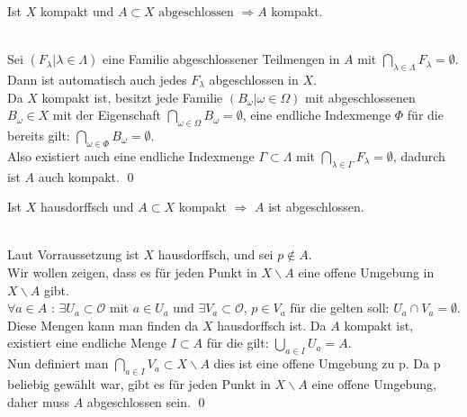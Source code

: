 \begin{Satz}
		Ist \(X\) kompakt und \(A \subset X \mbox{ abgeschlossen } \Rightarrow A\) kompakt.
\end{Satz}
%
	\\
 	Sei \((F_{\lambda} | \lambda \in \Lambda) \) eine Familie abgeschlossener Teilmengen in \(A\) mit \( \bigcap_{\lambda \in \Lambda } F_{\lambda} = \emptyset \).\\
	Dann ist automatisch auch jedes \(F_{\lambda} \) abgeschlossen in \(X\).\\
	Da \(X\) kompakt ist, besitzt jede Familie \((B_{\omega} | \omega \in \Omega) \) mit abgeschlossenen 
	\(B_{\omega} \in X \) mit der Eigenschaft \( \bigcap_{\omega \in \Omega} B_{\omega} = \emptyset\), eine 
	endliche Indexmenge \(\Phi\) für die bereits gilt: \( \bigcap_{\omega \in \Phi} B_{\omega} = \emptyset\).\\
	Also existiert auch eine endliche Indexmenge \( \Gamma \subset \Lambda \) mit \( \bigcap_{\lambda \in \Gamma } F_{\lambda} = \emptyset \), dadurch ist 
	\(A\) auch kompakt.
\qed
		
		
\begin{Satz}
	Ist \(X\) hausdorffsch und \(A \subset X \) kompakt \( \Rightarrow \) \(A\) ist abgeschlossen.
\end{Satz}
%
	\\
	Laut Vorraussetzung ist \(X\) hausdorffsch, und sei \(p \notin A \). \\
	Wir wollen zeigen, dass es für jeden Punkt in \(X \backslash A \) eine offene Umgebung in \(X \backslash A \) gibt.\\
	\( \forall a \in A\) : \(\exists U_{a}\subset \mathcal{O} \) mit \(  a \in U_{a}\) und \(\exists V_{a}\subset \mathcal{O} \), \(  p \in V_{a}\) für die gelten soll:
	 \(U_{a} \cap V_{a} = \emptyset \). Diese Mengen kann man finden da \(X\) hausdorffsch ist. Da \(A\) kompakt ist, existiert eine endliche Menge \(I \subset A\) für die gilt:
	\( \bigcup_{a \in I} U_{a} = A \). \\
	Nun definiert man \(\bigcap_{a \in I} V_{a} \subset X\backslash A \) dies ist eine offene Umgebung zu p. Da p beliebig gewählt war, gibt es 
	für jeden Punkt in \(X\backslash A \) eine offene Umgebung, daher muss \(A\) abgeschlossen sein. 
\qed
		
